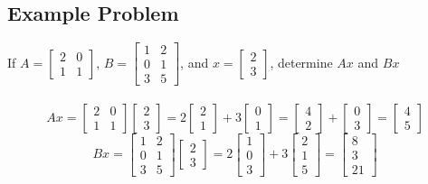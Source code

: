 \subsection{Example Problem}
If $A = \begin{bmatrix}
  2 & 0 \\
  1 & 1
\end{bmatrix}$, $B = \begin{bmatrix}
  1 & 2 \\
  0 & 1 \\
  3 & 5
\end{bmatrix}$, and $x = \begin{bmatrix}
  2 \\ 3
\end{bmatrix}$, determine $Ax$ and $Bx$
\\\\[8pt]
\[
  Ax = \begin{bmatrix}
    2 & 0 \\
    1 & 1
  \end{bmatrix} \begin{bmatrix}
    2 \\ 3
  \end{bmatrix} = 2 \begin{bmatrix}
    2 \\ 1
  \end{bmatrix} + 3 \begin{bmatrix}
    0 \\ 1
  \end{bmatrix} = \begin{bmatrix}
    4 \\ 2
  \end{bmatrix} + \begin{bmatrix}
    0 \\ 3
  \end{bmatrix} = \begin{bmatrix}
    4 \\ 5
  \end{bmatrix}
\]
\[
  Bx = \begin{bmatrix}
    1 & 2 \\
    0 & 1 \\
    3 & 5
  \end{bmatrix} \begin{bmatrix}
    2 \\ 3
  \end{bmatrix} = 2 \begin{bmatrix}
    1 \\ 0 \\ 3
  \end{bmatrix} + 3 \begin{bmatrix}
    2 \\ 1 \\ 5
  \end{bmatrix} = \begin{bmatrix}
    8 \\ 3 \\ 21
  \end{bmatrix}
\]
